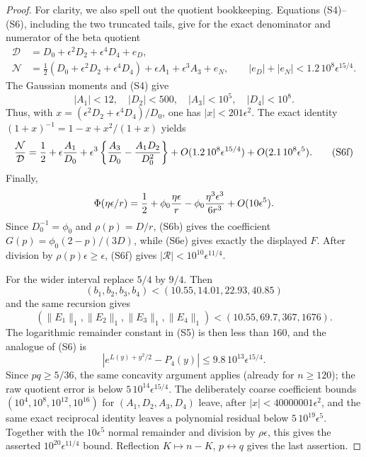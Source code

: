 \documentclass[11pt,a4paper]{article}
\numberwithin{equation}{section}
\theoremstyle{definition}
\theoremstyle{remark}
\begin{document}
\begin{proof}
For clarity, we also spell out the quotient bookkeeping.  Equations
(S4)--(S6), including the two truncated tails, give for the exact
denominator and numerator of the beta quotient
\begin{align*}
 \mathcal D&=D_0+\epsilon^2D_2+\epsilon^4D_4+e_D,\\
 \mathcal N&=\tfrac12(D_0+\epsilon^2D_2+\epsilon^4D_4)
       +\epsilon A_1+\epsilon^3A_3+e_N,
 \qquad |e_D|+|e_N|<1.2\,10^8\epsilon^{15/4}.
\end{align*}
The Gaussian moments and (S4) give
\[
 |A_1|<12,\quad |D_2|<500,\quad |A_3|<10^5,\quad |D_4|<10^8.
\]
Thus, with $x=(\epsilon^2D_2+\epsilon^4D_4)/D_0$, one has
$|x|<201\epsilon^2$.  The exact identity
$(1+x)^{-1}=1-x+x^2/(1+x)$ yields
\begin{equation}
 {\mathcal N\over\mathcal D}
 =\frac12+\epsilon{A_1\over D_0}
 +\epsilon^3\left\{{A_3\over D_0}-{A_1D_2\over D_0^2}\right\}
 +O(1.2\,10^8\epsilon^{15/4})+O(2.1\,10^8\epsilon^5).          \tag{S6f}
\end{equation}
Finally,
\[
 \Phi(\eta\epsilon/r)=\frac12+\phi_0{\eta\epsilon\over r}
       -\phi_0{\eta^3\epsilon^3\over6r^3}+O(10\epsilon^5).
\]
Since $D_0^{-1}=\phi_0$ and $\rho(p)=D/r$, (S6b) gives the coefficient
$G(p)=\phi_0(2-p)/(3D)$, while (S6e) gives exactly the displayed $F$.
After division by $\rho(p)\epsilon\ge\epsilon$, (S6f) gives
$|\mathcal R|<10^{10}\epsilon^{11/4}$.

For the wider interval replace $5/4$ by $9/4$.  Then
\[
 (b_1,b_2,b_3,b_4)<(10.55,14.01,22.93,40.85)
\]
and the same recursion gives
\[
 (\|E_1\|_1,\|E_2\|_1,\|E_3\|_1,\|E_4\|_1)
 <(10.55,69.7,367,1676).
\]
The logarithmic remainder constant in (S5) is then less than $160$, and
the analogue of (S6) is
\[
 |e^{L(y)+y^2/2}-P_4(y)|
 \le9.8\,10^{13}\epsilon^{15/4}.
\]
Since $pq\ge5/36$, the same concavity argument applies (already for
$n\ge120$); the raw quotient error is below
$5\,10^{14}\epsilon^{15/4}$.  The deliberately coarse coefficient bounds
$(10^4,10^8,10^{12},10^{16})$ for $(A_1,D_2,A_3,D_4)$ leave, after
$|x|<40000001\epsilon^2$, and the same exact reciprocal identity leaves a
polynomial residual below $5\,10^{19}\epsilon^5$.  Together with the
$10\epsilon^5$ normal remainder and division by $\rho\epsilon$, this gives
the asserted
$10^{20}\epsilon^{11/4}$ bound.  Reflection
$K\mapsto n-K$, $p\leftrightarrow q$ gives the last assertion.
\end{proof}
\end{document}
